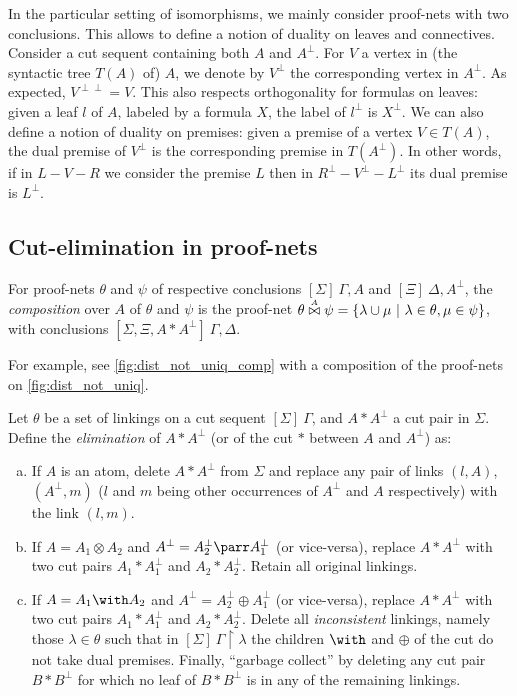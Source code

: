 \documentclass{lmcs}
\newcommand*{\orth}{^\perp} %
\newcommand*{\biorth}{^{\perp\perp}} %
\newcommand*{\tens}{\otimes} %
\newcommand{\symboltext}[2]{\mathrel{\overset{\makebox[0pt]{\mbox{\normalfont\tiny\sffamily \ensuremath{#1}}}}{#2}}} %
\newcommand*{\cutf}[3]{\ensuremath{#1\symboltext{#3}{\bowtie} #2}}
\begin{document}
In the particular setting of isomorphisms, we mainly consider proof-nets with two conclusions.
This allows to define a notion of duality on leaves and connectives.
Consider a cut sequent containing both $A$ and $A\orth$.
For $V$ a vertex in (the syntactic tree $T(A)$ of) $A$, we denote by $V\orth$ the corresponding vertex in $A\orth$.
As expected, $V\biorth=V$.
This also respects orthogonality for formulas on leaves: given a leaf $l$ of $A$, labeled by a formula $X$, the label of $l\orth$ is $X\orth$.
We can also define a notion of duality on premises:
given a premise of a vertex $V\in T(A)$, the dual premise of $V\orth$ is the corresponding premise in $T(A\orth)$.
In other words, if in $L-V-R$ we consider the premise $L$ then in $R\orth-V\orth-L\orth$ its dual premise is $L\orth$.

\subsection{Cut-elimination in proof-nets}
\label{sec:ce_pn}

\begin{defi}[Composition]
\label{def:cut}
For proof-nets $\theta$ and $\psi$ of respective conclusions $[\Sigma]~\Gamma,A$ and $[\Xi]~\Delta,A\orth$, the \emph{composition} over $A$ of $\theta$ and $\psi$ is the proof-net ${\cutf{\theta}{\psi}{A}=\{\lambda\cup\mu\ |\ \lambda\in\theta,\mu\in\psi\}}$, with conclusions $[\Sigma,\Xi,A\ast A\orth]~\Gamma,\Delta$.
\end{defi}

For example, see \autoref{fig:dist_not_uniq_comp} with a composition of the proof-nets on \autoref{fig:dist_not_uniq}.

\begin{defi}
\label{def:cut_elim}
Let $\theta$ be a set of linkings on a cut sequent $[\Sigma]~\Gamma$, and $A\ast A\orth$ a cut pair in $\Sigma$.
Define the \emph{elimination} of $A\ast A\orth$ (or of the cut $\ast$ between $A$ and $A\orth$) as:
\begin{enumerate}[(a)]
\item If $A$ is an atom, delete $A\ast A\orth$ from $\Sigma$ and replace any pair of links $(l,A)$, $(A\orth,m)$ ($l$ and $m$ being other occurrences of $A\orth$ and $A$ respectively) with the link $(l,m)$.
\item If $A=A_1\tens A_2$ and $A\orth=A_2\orth\parr A_1\orth$ (or vice-versa), replace $A\ast A\orth$ with two cut pairs $A_1\ast A_1\orth$ and $A_2\ast A_2\orth$. Retain all original linkings.
\item If $A=A_1\with A_2$ and $A\orth=A_2\orth\oplus A_1\orth$ (or vice-versa), replace $A\ast A\orth$ with two cut pairs $A_1\ast A_1\orth$ and $A_2\ast A_2\orth$. Delete all \emph{inconsistent} linkings, namely those $\lambda\in\theta$ such that in $[\Sigma]~\Gamma\upharpoonright\lambda$ the children $\with$ and $\oplus$ of the cut do not take dual premises.
Finally, ``garbage collect'' by deleting any cut pair $B\ast B\orth$ for which no leaf of $B\ast B\orth$ is in any of the remaining linkings.
\end{enumerate}
\end{defi}
\end{document}
